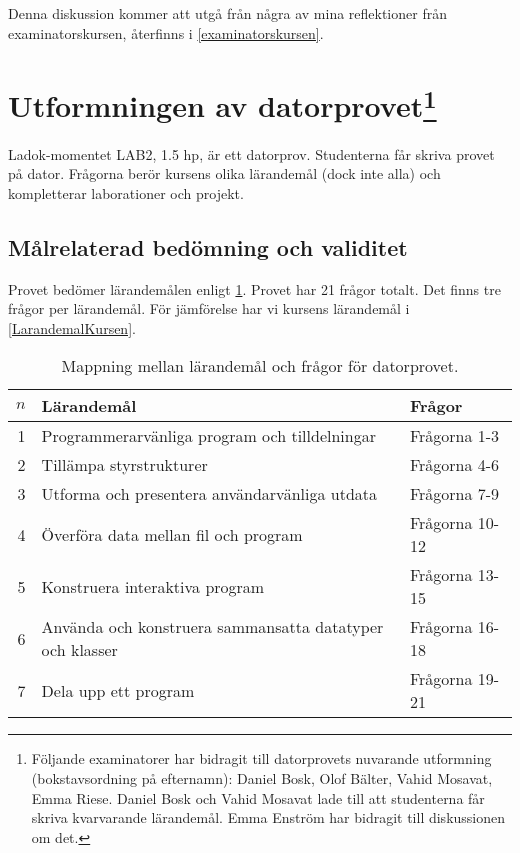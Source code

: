 Denna diskussion kommer att utgå från några av mina reflektioner från 
examinatorskursen, återfinns i \cref{examinatorskursen}.


\section{Utformningen av datorprovet\protect\footnote{%
    Följande examinatorer har bidragit till datorprovets nuvarande utformning 
    (bokstavsordning på efternamn):
    Daniel Bosk, Olof Bälter, Vahid Mosavat, Emma Riese.
    Daniel Bosk och Vahid Mosavat lade till att studenterna får skriva 
    kvarvarande lärandemål.
    Emma Enström har bidragit till diskussionen om det.
}}

Ladok-momentet LAB2, 1.5 hp, är ett datorprov.
Studenterna får skriva provet på dator.
Frågorna berör kursens olika lärandemål (dock inte alla) och kompletterar 
laborationer och projekt.

\subsection{Målrelaterad bedömning och validitet}

Provet bedömer lärandemålen enligt \cref{LärandemålDatorprovet}.
Provet har 21 frågor totalt.
Det finns tre frågor per lärandemål.
För jämförelse har vi kursens lärandemål i \cref{LarandemalKursen}.

\begin{table}[p]
  \caption{Mappning mellan lärandemål och frågor för datorprovet.}
  \label{LärandemålDatorprovet}
  \begin{tabular}{rll}
    \toprule
    \(n\) & Lärandemål & Frågor\\
    \midrule
    1 & Programmerarvänliga program och tilldelningar & Frågorna 1-3\\
    2 & Tillämpa styrstrukturer & Frågorna 4-6\\
    3 & Utforma och presentera användarvänliga utdata & Frågorna 7-9\\
    4 & Överföra data mellan fil och program & Frågorna 10-12\\
    5 & Konstruera interaktiva program & Frågorna 13-15\\
    6 & Använda och konstruera sammansatta datatyper och klasser & Frågorna 
    16-18\\
    7 & Dela upp ett program & Frågorna 19-21\\
    \bottomrule
  \end{tabular}
\end{table}

